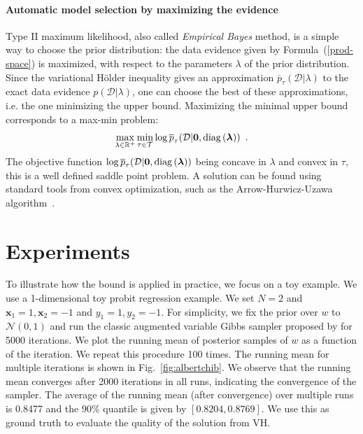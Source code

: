 \documentclass{article} %
\newcommand{\Holder}{H\"older\xspace}
\newcommand{\dataset}{\mathcal{D}}
\newcommand{\diag}[1]{\mathop{\textrm{diag}}\left(#1\right)}
\newcommand{\tauspace}{\mathcal{T}}
\newcommand{\normdist}{\mathcal{N}}
\newcommand{\red}[1]{{\color{red}#1}}
\def\bx{\mathbf{x}}
\def\eye{\mathbf{I}}
\def\bzeros{\mathbf{0}}
\def\proba{p}
\renewcommand{\Re}{\mathbb{R}}
\begin{document}
\paragraph{Automatic model selection by maximizing the evidence}
Type II maximum likelihood, also called \emph{Empirical Bayes} method, is a simple way to choose the prior distribution: the data evidence given by Formula~(\ref{prod-space}) is maximized, with respect to the parameters $\lambda$ of the prior distribution.%
Since the variational \Holder inequality gives an approximation $\overline{\proba}_\tau(\dataset|\lambda)$ to the exact data evidence $\proba(\dataset|\lambda)$, one can choose the best of these approximations, i.e. the one minimizing the upper bound. Maximizing the minimal upper bound corresponds to a max-min problem:
\begin{eqnarray} 
\max_{\lambda\in\Re^+} \min_{\tau\in\tauspace} \log \overline{\proba}_\tau(\dataset|\bzeros,\diag{\blambda})
\enspace.
\end{eqnarray}
\red{The objective function $ \log \overline{\proba}_\tau(\dataset|\bzeros,\diag{\blambda})$ being concave in $\lambda$ and convex in $\tau$, this is a well defined saddle point problem. A solution can be found using standard tools from convex optimization, such as the Arrow-Hurwicz-Uzawa algorithm~\citep{arrow1958studies, nedic2009subgradient}.}




\section{Experiments}
To illustrate how the bound is applied in practice, we focus on a toy example.
We use a 1-dimensional toy probit regression example. We set $N=2$ and $\bx_1=1, \bx_2=-1$ and $y_1=1, y_2=-1$. For simplicity, we fix the prior over $w$ to $\normdist(0,1)$ and run the classic augmented variable Gibbs sampler proposed by \citet{albert1993bayesian} for 5000 iterations. We plot the running mean of posterior samples of $w$ as a function of the iteration. We repeat this procedure 100 times. The running mean for multiple iterations is shown in Fig.~\ref{fig:albertchib}. 
We observe that the running mean converges after 2000 iterations in all runs, indicating the convergence of the sampler. The average of the running mean (after convergence) over multiple runs is 0.8477 and the $90\%$ quantile is given by $[0.8204, 0.8769]$.  We use this as ground truth to evaluate the quality of the solution from VH.
\end{document}

